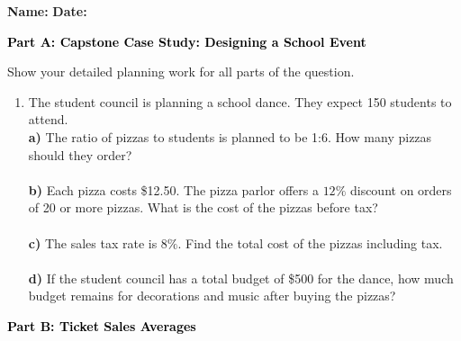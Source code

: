 \documentclass[12pt, letterpaper, fleqn]{article}
\newcommand{\blanklong}{\underline{\hspace{6.5cm}}}
\begin{document}
\textbf{Name:} \underline{\hspace{5cm}}
\hfill
\textbf{Date:} \underline{\hspace{3cm}}\\

\begin{tcolorbox}[colback=black!10]
    \large\textcolor{black}{\textbf{Part A: Capstone Case Study: Designing a School Event}}
\end{tcolorbox}

\vspace{3mm}

\noindent
Show your detailed planning work for all parts of the question.

\vspace{5mm}

\begin{enumerate}[itemsep=2.2cm, leftmargin=0.6cm]
\item The student council is planning a school dance. They expect 150 students to attend. \\
\textbf{a)} The ratio of pizzas to students is planned to be 1:6. How many pizzas should they order? \\
\blanklong \\
\textbf{b)} Each pizza costs \$12.50. The pizza parlor offers a $12\%$ discount on orders of 20 or more pizzas. What is the cost of the pizzas before tax? \\
\blanklong \\
\textbf{c)} The sales tax rate is $8\%$. Find the total cost of the pizzas including tax. \\
\blanklong \\
\textbf{d)} If the student council has a total budget of \$500 for the dance, how much budget remains for decorations and music after buying the pizzas? \\
\blanklong
\end{enumerate}

\newpage

\begin{tcolorbox}[colback=black!10]
    \large\textcolor{black}{\textbf{Part B: Ticket Sales Averages}}
\end{tcolorbox}
\end{document}
